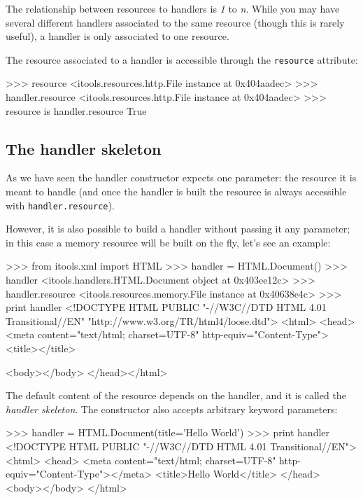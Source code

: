 The relationship between resources to handlers is {\em 1} to {\em n}.
While you may have several different handlers associated to the same
resource (though this is rarely useful), a handler is only associated
to one resource.

The resource associated to a handler is accessible through the {\tt resource}
attribute:

\begin{code}
    >>> resource
    <itools.resources.http.File instance at 0x404aadec>
    >>> handler.resource
    <itools.resources.http.File instance at 0x404aadec>
    >>> resource is handler.resource
    True
\end{code}


\subsection{The handler skeleton}

As we have seen the handler constructor expects one parameter: the resource
it is meant to handle (and once the handler is built the resource is always
accessible with {\tt handler.resource}).

However, it is also possible to build a handler without passing it any
parameter; in this case a memory resource will be built on the fly, let's
see an example:

\begin{code}
    >>> from itools.xml import HTML
    >>> handler = HTML.Document()
    >>> handler
    <itools.handlers.HTML.Document object at 0x403ee12c>
    >>> handler.resource
    <itools.resources.memory.File instance at 0x40638e4c>
    >>> print handler
    <!DOCTYPE HTML PUBLIC "-//W3C//DTD HTML 4.01 Transitional//EN"
      "http://www.w3.org/TR/html4/loose.dtd">
    <html>
      <head>
        <meta content="text/html; charset=UTF-8" http-equiv="Content-Type">
        <title></title>
      
      <body></body>
    </head></html>
\end{code}

The default content of the resource depends on the handler, and it is called
the {\em handler skeleton}. The constructor also accepts arbitrary keyword
parameters:

\begin{code}
    >>> handler = HTML.Document(title='Hello World')
    >>> print handler
    <!DOCTYPE HTML PUBLIC "-//W3C//DTD HTML 4.01 Transitional//EN">
    <html>
      <head>
        <meta content="text/html; charset=UTF-8" http-equiv="Content-Type"></meta>
        <title>Hello World</title>
      </head>
      <body></body>
    </html>
\end{code}

